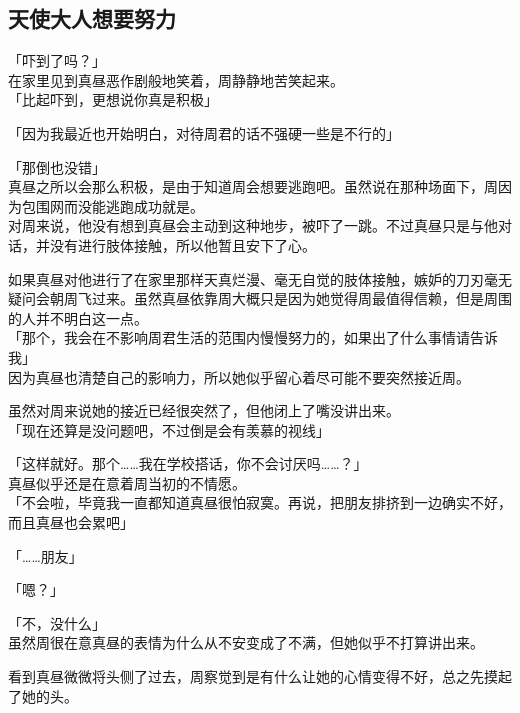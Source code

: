 \subsection{天使大人想要努力}

「吓到了吗？」\\

在家里见到真昼恶作剧般地笑着，周静静地苦笑起来。\\

「比起吓到，更想说你真是积极」

「因为我最近也开始明白，对待周君的话不强硬一些是不行的」

「那倒也没错」\\

真昼之所以会那么积极，是由于知道周会想要逃跑吧。虽然说在那种场面下，周因为包围网而没能逃跑成功就是。\\

对周来说，他没有想到真昼会主动到这种地步，被吓了一跳。不过真昼只是与他对话，并没有进行肢体接触，所以他暂且安下了心。

如果真昼对他进行了在家里那样天真烂漫、毫无自觉的肢体接触，嫉妒的刀刃毫无疑问会朝周飞过来。虽然真昼依靠周大概只是因为她觉得周最值得信赖，但是周围的人并不明白这一点。\\

「那个，我会在不影响周君生活的范围内慢慢努力的，如果出了什么事情请告诉我」\\

因为真昼也清楚自己的影响力，所以她似乎留心着尽可能不要突然接近周。

虽然对周来说她的接近已经很突然了，但他闭上了嘴没讲出来。\\

「现在还算是没问题吧，不过倒是会有羡慕的视线」

「这样就好。那个……我在学校搭话，你不会讨厌吗……？」\\

真昼似乎还是在意着周当初的不情愿。\\

「不会啦，毕竟我一直都知道真昼很怕寂寞。再说，把朋友排挤到一边确实不好，而且真昼也会累吧」

「……朋友」

「嗯？」

「不，没什么」\\

虽然周很在意真昼的表情为什么从不安变成了不满，但她似乎不打算讲出来。

看到真昼微微将头侧了过去，周察觉到是有什么让她的心情变得不好，总之先摸起了她的头。\\

